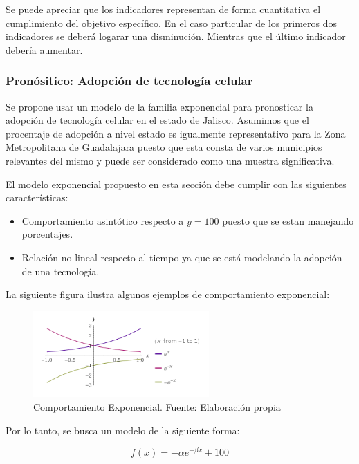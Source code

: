 \documentclass{article}
\begin{document}
Se puede apreciar que los indicadores representan de forma cuantitativa el cumplimiento del objetivo específico.
En el caso particular de los primeros dos indicadores se deberá logarar una disminución. Mientras que el último
indicador debería aumentar.

\subsubsection{Pronósitico: Adopción de tecnología celular}

Se propone usar un modelo de la familia exponencial para pronosticar la adopción de tecnología celular en el estado
de Jalisco. Asumimos que el procentaje de adopción a nivel estado es igualmente representativo para la Zona
Metropolitana de Guadalajara puesto que esta consta de varios municipios relevantes del mismo y
puede ser considerado como una muestra significativa.

El modelo exponencial propuesto en esta sección debe cumplir con las siguientes características:
\begin{itemize}
	\item Comportamiento asintótico respecto a $y=100$ puesto que se estan manejando porcentajes.
	\item Relación no lineal respecto al tiempo ya que se está modelando la adopción de una tecnología.
\end{itemize}

La siguiente figura ilustra algunos ejemplos de comportamiento exponencial:

	\begin{figure}[H]\centering
	\includegraphics[width=0.6\textwidth]{resources/img/modelo_exp.png}
	\caption{\label{fig:exponential_behaviour} Comportamiento Exponencial. Fuente: Elaboración propia}
    \end{figure}

Por lo tanto, se busca un modelo de la siguiente forma:

\begin{equation}
f(x) = -\alpha e^{-\beta x} + 100
\end{equation}
\end{document}

